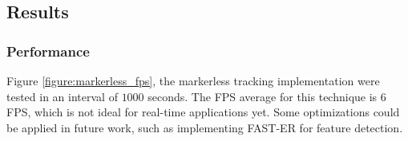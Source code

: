 \clearpage


\subsection{Results} %
\label{sub:evaluation:markerless_tracking_algorithm:results}

\subsubsection{Performance} %
\label{subsub:evaluation:markerless_tracking_algorithm:results:performance}

Figure \ref{figure:markerless_fps}, the markerless tracking implementation were tested in an interval of $1000$ seconds. The FPS average for this technique is 6 FPS, which is not ideal for real-time applications yet. Some optimizations could be applied in future work, such as implementing FAST-ER \cite{RostenFaster2010} for feature detection.

